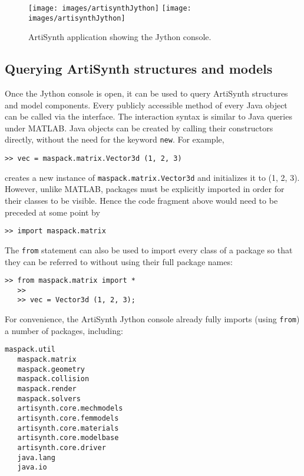 \documentclass{article}
\begin{document}
\begin{figure}[t]
\begin{center}
\iflatexml
 \texttt{[image: images/artisynthJython]}
\else
 \texttt{[image: images/artisynthJython]}
\fi
\end{center}
\caption{ArtiSynth application showing the Jython console.}
\label{artisynthJython:fig}
\end{figure}

\subsection{Querying ArtiSynth structures and models}
\label{JythonQuerying:sec}

Once the Jython console is open, it can be used to query ArtiSynth
structures and model components. Every publicly accessible method of
every Java object can be called via the interface.  The interaction
syntax is similar to Java queries under MATLAB.  Java
objects can be created by calling their constructors directly, without
the need for the keyword {\tt new}.  For example,
%
\begin{lstlisting}[]
   >> vec = maspack.matrix.Vector3d (1, 2, 3)
\end{lstlisting}
%
creates a new instance of {\tt maspack.matrix.Vector3d} and
initializes it to (1, 2, 3). However, unlike MATLAB, packages must be
explicitly imported in order for their classes to be visible.
Hence the code fragment above would need to be preceded 
at some point by
%
\begin{lstlisting}[]
   >> import maspack.matrix
\end{lstlisting}
%
The {\tt from} statement can also be used to import every class of a
package so that they can be referred to without using their full
package names:
%
\begin{lstlisting}[]
   >> from maspack.matrix import *
   >>
   >> vec = Vector3d (1, 2, 3);
\end{lstlisting}
%
For convenience, the ArtiSynth Jython console already fully imports
(using {\tt from}) a number of packages, including:
%
\begin{lstlisting}[]
   maspack.util
   maspack.matrix
   maspack.geometry
   maspack.collision
   maspack.render
   maspack.solvers
   artisynth.core.mechmodels
   artisynth.core.femmodels
   artisynth.core.materials
   artisynth.core.modelbase
   artisynth.core.driver
   java.lang
   java.io
\end{lstlisting}
%
\end{document}
